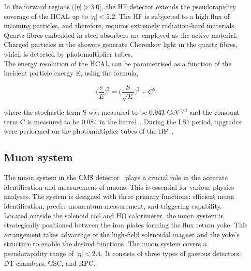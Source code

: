 In the forward regions ($|\eta| > 3.0$), the \ac{HF} detector extends the pseudorapidity coverage of the \ac{HCAL} up to $|\eta| < 5.2$. 
The \ac{HF} is subjected to a high flux of incoming particles, and therefore, requires extremely radiation-hard materials. 
Quartz fibres embedded in steel absorbers are employed as the active material. 
Charged particles in the showers generate Cherenkov light in the quartz fibres, which is detected by photomultiplier tubes. \\

The energy resolution of the \ac{HCAL} can be parametrised as a function of the incident particle energy E, using the formula, 

\begin{equation}
\Big(\frac{\sigma}{E}\Big)^2 = \Big(\frac{S}{\sqrt{E}}\Big)^2 + C^2
\end{equation}

where the stochastic term S was measured to be 0.943 GeV${^{1/2}}$ and the constant term C is measured to be 0.084 in the barrel~\cite{USCMS:2009fxn}.
During the \ac{LS1} period, upgrades were performed on the photomultiplier tubes of the \ac{HF}~\cite{CMS:2012tda}.

\subsection{Muon system}

The muon system in the \ac{CMS} detector~\cite{CMS_Setup,Abbiendi:2015txa} plays a crucial role in the accurate identification and measurement of muons. 
This is essential for various physics analyses. 
The system is designed with three primary functions: efficient muon identification, precise momentum measurement, and triggering capability. \\

Located outside the solenoid coil and \ac{HO} calorimeter, the muon system is strategically positioned between the iron plates forming the flux return yoke. 
This arrangement takes advantage of the high-field solenoidal magnet and the yoke's structure to enable the desired functions.
The muon system covers a pseudorapidity range of $|\eta| < 2.4$. 
It consists of three types of gaseous detectors: \ac{DT} chambers, \ac{CSC}, and \ac{RPC}. \\

